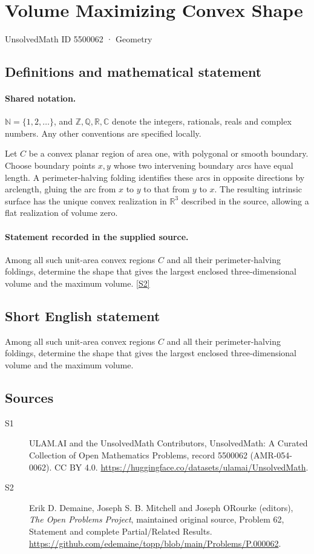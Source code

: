 \documentclass[11pt]{article}
\newcommand{\sref}[2]{\hyperlink{source:#1:#2}{[S#2]}}
\begin{document}
\setcounter{section}{5500061}
\section{Volume Maximizing Convex Shape}\label{5500062}
{\small\sffamily UnsolvedMath ID 5500062 · Geometry}
\subsection{Definitions and mathematical statement}

\paragraph{Shared notation.}$\mathbb N=\{1,2,\ldots\}$, and $\mathbb Z,\mathbb Q,\mathbb R,\mathbb C$ denote the integers, rationals, reals and complex numbers. Any other conventions are specified locally.


Let $C$ be a convex planar region of area one, with polygonal or smooth boundary. Choose boundary points $x,y$ whose two intervening boundary arcs have equal length. A perimeter-halving folding identifies these arcs in opposite directions by arclength, gluing the arc from $x$ to $y$ to that from $y$ to $x$. The resulting intrinsic surface has the unique convex realization in $\mathbb R^3$ described in the source, allowing a flat realization of volume zero.
\paragraph{Statement recorded in the supplied source.}
Among all such unit-area convex regions $C$ and all their perimeter-halving foldings, determine the shape that gives the largest enclosed three-dimensional volume and the maximum volume. \sref{5500062}{2}
\subsection{Short English statement}
Among all such unit-area convex regions $C$ and all their perimeter-halving foldings, determine the shape that gives the largest enclosed three-dimensional volume and the maximum volume.
\subsection{Sources}
\begin{description}
\item[\hypertarget{source:5500062:1}{S1}] ULAM.AI and the UnsolvedMath Contributors, UnsolvedMath: A Curated Collection of Open Mathematics Problems, record 5500062 (AMR-054-0062). CC BY 4.0. \url{https://huggingface.co/datasets/ulamai/UnsolvedMath}.
\item[\hypertarget{source:5500062:2}{S2}] Erik D. Demaine, Joseph S. B. Mitchell and Joseph O\textquotesingle Rourke (editors), \emph{The Open Problems Project}, maintained original source, Problem 62, Statement and complete Partial/Related Results. \url{https://github.com/edemaine/topp/blob/main/Problems/P.000062}.
\end{description}
\label{end:5500062}
\end{document}
